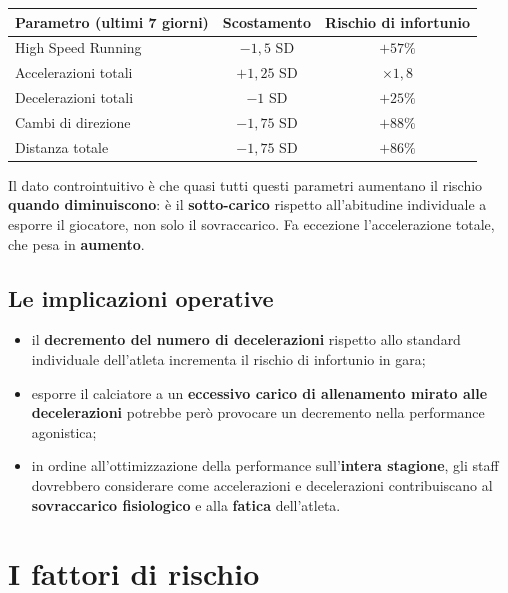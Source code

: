 \begin{table}[htbp]
  \centering
  \small
  \renewcommand{\arraystretch}{1.3}
  \begin{tabularx}{\textwidth}{|X|c|c|}
    \hline
    \textbf{Parametro (ultimi 7 giorni)} & \textbf{Scostamento} & \textbf{Rischio di infortunio} \\
    \hline
    High Speed Running & $-1,5$ SD & $+57\%$ \\
    \hline
    Accelerazioni totali & $+1,25$ SD & $\times 1,8$ \\
    \hline
    Decelerazioni totali & $-1$ SD & $+25\%$ \\
    \hline
    Cambi di direzione & $-1,75$ SD & $+88\%$ \\
    \hline
    Distanza totale & $-1,75$ SD & $+86\%$ \\
    \hline
  \end{tabularx}
\end{table}

Il dato controintuitivo è che quasi tutti questi parametri aumentano il rischio \textbf{quando
diminuiscono}: è il \textbf{sotto-carico} rispetto all'abitudine individuale a esporre il giocatore,
non solo il sovraccarico. Fa eccezione l'accelerazione totale, che pesa in \textbf{aumento}.

\subsection{Le implicazioni operative}

\begin{itemize}
  \item il \textbf{decremento del numero di decelerazioni} rispetto allo standard individuale
    dell'atleta incrementa il rischio di infortunio in gara;
  \item esporre il calciatore a un \textbf{eccessivo carico di allenamento mirato alle
    decelerazioni} potrebbe però provocare un decremento nella performance agonistica;
  \item in ordine all'ottimizzazione della performance sull'\textbf{intera stagione}, gli staff
    dovrebbero considerare come accelerazioni e decelerazioni contribuiscano al \textbf{sovraccarico
    fisiologico} e alla \textbf{fatica} dell'atleta.
\end{itemize}

\section{I fattori di rischio}

